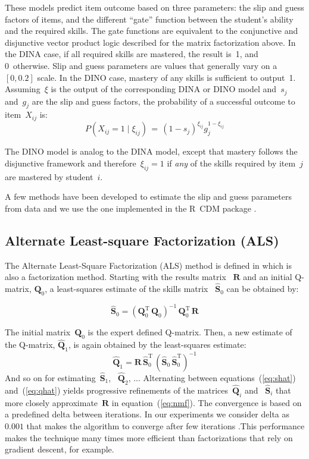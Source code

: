 These models predict item outcome based on three parameters: the slip and guess factors of items, and the different ``gate'' function between the student's ability and the required skills.  The gate functions are equivalent to the conjunctive and disjunctive vector product logic described for the matrix factorization above.  In the DINA case, if all required skills are mastered, the result is~1, and 0~otherwise. Slip and guess parameters are values that generally vary on a~$[0,0.2]$ scale. In the DINO case, mastery of any skills is sufficient to output~1.  Assuming~$\xi$ is the output of the corresponding DINA or DINO model and~$s_j$ and~$g_j$ are the slip and guess factors, the probability of a successful outcome to item~$X_{ij}$ is:
\begin{equation}
 P(X_{ij} \!=\! 1 \; | \; \xi_{ij}) \,=\, (1-s_j)^{\xi_{ij}} g_j^{1-\xi_{ij}}
\label{DinoEQ}
\end{equation}

The DINO model is analog to the DINA model, except that mastery follows the disjunctive
framework and therefore~$\xi_{ij}=1$ if \textit{any} of the skills required by item~$j$ are
mastered by student~$i$.

A few methods have been developed to estimate the slip and guess parameters from data and we use the one implemented in the R~CDM package \citep{Robitzsch2012}.

\subsection{Alternate Least-square Factorization (ALS)}
\label{ALS-Def}

The {Alternate Least-Square Factorization (ALS)} method is defined in \cite{Desmarais2013aied} which is also a factorization method. Starting with the results matrix ~$\mathbf{R}$ and an initial Q-matrix, $\mathbf{Q}_0$, a least-squares estimate of the skills matrix ~$\mathbf{\hat{S}}_0$ can be obtained by:

\[
  \mathbf{\hat{S}}_0 = (\mathbf{Q}_0^{\mathrm{T}}  \, \mathbf{Q}_0)^{-1} \, \mathbf{Q}_0^{\mathrm{T}} \, \mathbf{R} \label{eq:shat}
\]

The initial matrix~$\mathbf{{Q}}_0$ is the expert defined Q-matrix. Then, a new estimate of the Q-matrix, $\mathbf{\hat{Q}}_1$, is again obtained by the least-squares estimate:
\[
  \mathbf{\hat{Q}}_1 = \mathbf{R} \, \mathbf{\hat{S}}_0^{\mathrm{T}} \, (\mathbf{\hat{S}}_0 \, \mathbf{\hat{S}}_0^{\mathrm{T}})^{-1} \label{eq:qhat}
\]
And so on for estimating~$\mathbf{\hat{S}}_1$, ~$\mathbf{\hat{Q}}_2$, ... Alternating between equations~(\ref{eq:shat}) and~(\ref{eq:qhat}) yields progressive refinements of the matrices~$\mathbf{\hat{Q}}_i$ and ~$\mathbf{\hat{S}}_i$ that more closely approximate~$\mathbf{R}$ in equation~(\ref{eq:nmf}).  The convergence is based on a predefined delta between iterations. In our experiments we consider delta as $0.001$ that makes the algorithm to converge after few iterations .This performance makes the technique many times more efficient than factorizations that rely on gradient descent, for example.

